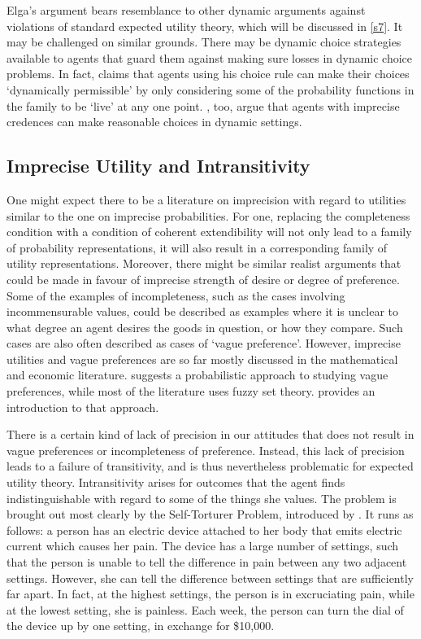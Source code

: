 Elga's argument bears resemblance to other dynamic arguments against violations of standard expected utility theory, which will be discussed in \autoref{s7}. It may be challenged on similar grounds. There may be dynamic choice strategies available to agents that guard them against making sure losses in dynamic choice problems. In fact, \citet{Williams2014} claims that agents using his choice rule can make their choices `dynamically permissible' by only considering some of the probability functions in the family to be `live' at any one point. \citet{BradleySteele2014}, too, argue that agents with imprecise credences can make reasonable choices in dynamic settings.

\subsection{Imprecise Utility and Intransitivity}\label{subs43}

One might expect there to be a literature on imprecision with regard to utilities similar to the one on imprecise probabilities. For one, replacing the completeness condition with a condition of coherent extendibility will not only lead to a family of probability representations, it will also result in a corresponding family of utility representations. Moreover, there might be similar realist arguments that could be made in favour of imprecise strength of desire or degree of preference. Some of the examples of incompleteness, such as the cases involving incommensurable values, could be described as examples where it is unclear to what degree an agent desires the goods in question, or how they compare. Such cases are also often described as cases of `vague preference'. However, imprecise utilities and vague preferences are so far mostly discussed in the mathematical and economic literature. \citet{Fishburn1998} suggests a probabilistic approach to studying vague preferences, while most of the literature uses fuzzy set theory. \citet{Salles1998} provides an introduction to that approach.

There is a certain kind of lack of precision in our attitudes that does not result in vague preferences or incompleteness of preference. Instead, this lack of precision leads to a failure of transitivity, and is thus nevertheless problematic for expected utility theory. Intransitivity arises for outcomes that the agent finds indistinguishable with regard to some of the things she values. The problem is brought out most clearly by the Self-Torturer Problem, introduced by \citet{Quinn1990}. It runs as follows: a person has an electric device attached to her body that emits electric current which causes her pain. The device has a large number of settings, such that the person is unable to tell the difference in pain between any two adjacent settings. However, she can tell the difference between settings that are sufficiently far apart. In fact, at the highest settings, the person is in excruciating pain, while at the lowest setting, she is painless. Each week, the person can turn the dial of the device up by one setting, in exchange for \$10,000.


